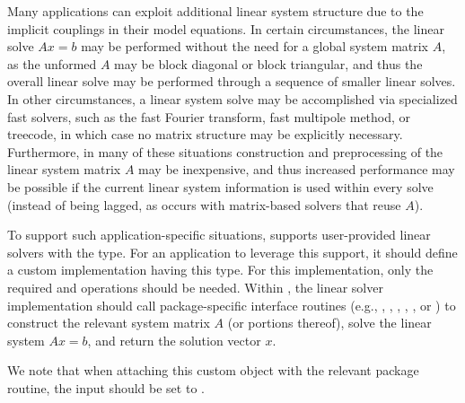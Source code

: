 Many applications can exploit additional linear system structure due to the
implicit couplings in their model equations.  In certain circumstances,
the linear solve $Ax=b$ may be performed without the need for a global
system matrix $A$, as the unformed $A$ may be block diagonal or block triangular,
and thus the overall linear solve may be performed through a sequence of smaller
linear solves.  In other circumstances, a linear system solve may be accomplished
via specialized fast solvers, such as the fast Fourier transform, fast multipole
method, or treecode, in which case no matrix structure may be explicitly necessary.
Furthermore, in many of these situations construction and preprocessing of the
linear system matrix $A$ may be inexpensive, and thus increased performance
may be possible if the current linear system information is used within every solve
(instead of being lagged, as occurs with matrix-based solvers that reuse $A$).

To support such application-specific situations, {\sundials} supports user-provided
linear solvers with the  type.  For an
application to leverage this support, it should define a custom {\sunlinsol}
implementation having this type.  For this implementation, only the required
 and  operations should be needed.  Within
, the linear solver implementation should call package-specific
interface routines (e.g., ,
, ,
, ,  or
) to construct the relevant system matrix $A$ (or
portions thereof), solve the linear system $Ax=b$, and return the solution vector $x$.

We note that when attaching this custom {\sunlinsol} object with the relevant
{\sundials} package  routine, the input {\sunmatrix} 
should be set to .
